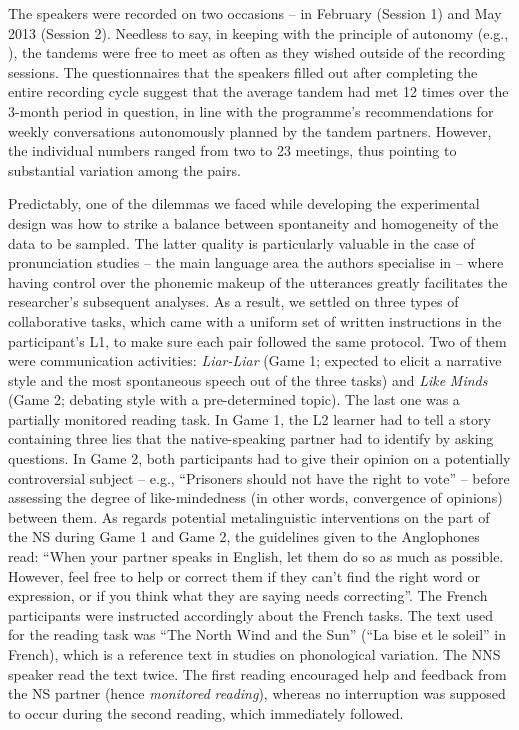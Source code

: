 \documentclass[output=paper,colorlinks,citecolor=brown,modfonts,nonflat]{../langscibook}
\begin{document}
The speakers were recorded on two occasions – in February (Session 1) and May 2013 (Session 2). Needless to say, in keeping with the principle of autonomy (e.g., \citealt{BrammertsCalvert2003}), the tandems were free to meet as often as they wished outside of the recording sessions. The questionnaires that the speakers filled out after completing the entire recording cycle suggest that the average tandem had met 12 times over the 3-month period in question, in line with the programme’s recommendations for weekly conversations autonomously planned by the tandem partners. However, the individual numbers ranged from two to 23 meetings, thus pointing to substantial variation among the pairs.

Predictably, one of the dilemmas we faced while developing the experimental design was how to strike a balance between spontaneity and homogeneity of the data to be sampled. The latter quality is particularly valuable in the case of pronunciation studies – the main language area the authors specialise in – where having control over the phonemic makeup of the utterances greatly facilitates the researcher’s subsequent analyses. As a result, we settled on three types of collaborative tasks, which came with a uniform set of written instructions in the participant’s L1, to make sure each pair followed the same protocol. Two of them were communication activities: \textit{Liar-Liar} (Game 1; expected to elicit a narrative style and the most spontaneous speech out of the three tasks) and \textit{Like} \textit{Minds} (Game 2; debating style with a pre-determined topic). The last one was a partially monitored reading task. In Game 1, the L2 learner had to tell a story containing three lies that the native-speaking partner had to identify by asking questions. In Game 2, both participants had to give their opinion on a potentially controversial subject – e.g., “Prisoners should not have the right to vote” – before assessing the degree of like-mindedness (in other words, convergence of opinions) between them. As regards potential metalinguistic interventions on the part of the NS during Game 1 and Game 2, the guidelines given to the Anglophones read: “When your partner speaks in English, let them do so as much as possible. However, feel free to help or correct them if they can’t find the right word or expression, or if you think what they are saying needs correcting”. The French participants were instructed accordingly about the French tasks. The text used for the reading task was “The North Wind and the Sun” (“La bise et le soleil” in French), which is a reference text in studies on phonological variation. The NNS speaker read the text twice. The first reading encouraged help and feedback from the NS partner (hence \textit{monitored} \textit{reading}), whereas no interruption was supposed to occur during the second reading, which immediately followed.
\end{document}
